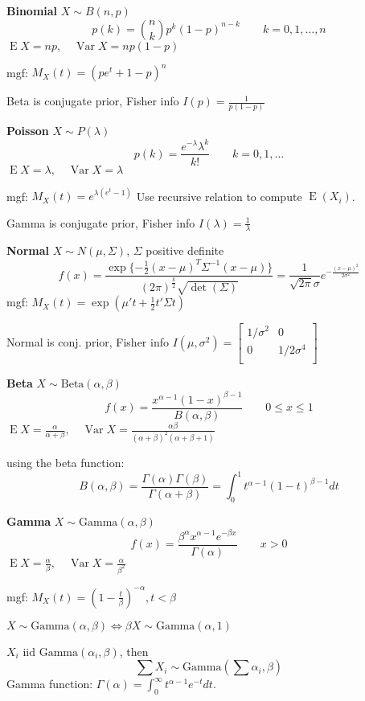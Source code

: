 \documentclass[10pt, twocolumn]{article}
\newcommand{\iid}{\text{ iid }}
\newcommand{\Expect}{\operatorname{E}}
\newcommand{\Var}{\operatorname{Var}}
\begin{document}
\textbf{Binomial}
$X \sim B(n, p)$
\[
    p(k) = \binom{n}{k} p^k (1-p)^{n-k}
    \qquad k = 0, 1, \dots, n
\]
$\Expect X = np, \quad \Var X = np(1-p)$

mgf: $M_X (t) = (pe^t + 1 - p)^n$

Beta is conjugate prior, Fisher info $I(p) = \frac{1}{p(1 - p)}$

\textbf{Poisson}
$X \sim P(\lambda)$
\[
    p(k) = \frac{e^{-\lambda} \lambda^k}{k!}
    \qquad k = 0, 1, \dots
\]
$\Expect X = \lambda, \quad \Var X = \lambda$

mgf: $M_X (t) = e^{\lambda (e^t -1)}$ Use recursive relation to compute
$\Expect(X_i)$.

Gamma is conjugate prior, Fisher info $I(\lambda) = \frac{1}{\lambda}$

\textbf{Normal}
$X \sim N(\mu, \Sigma)$, $\Sigma$ positive definite
\[
    f(x) = \frac{\exp\{ - \frac{1}{2}(x - \mu)^T \Sigma^{-1} (x - \mu) \}}
        {(2\pi)^{\frac{k}{2}} \sqrt{\det(\Sigma)}}
        = \frac{1}{\sqrt{2 \pi} \sigma} e^{-\frac{(x - \mu)^2}{2
        \sigma^2}}
\]
mgf: $M_X (t) = \exp (\mu' t + \frac{1}{2} t' \Sigma t)$

Normal is conj. prior, Fisher info $I(\mu, \sigma^2) = 
[\begin{smallmatrix}
        1 / \sigma^2 & 0 \\
        0 & 1 / 2\sigma^4 \\
\end{smallmatrix}]$

\textbf{Beta}
$ X \sim \text{Beta}(\alpha, \beta)$
\[
    f(x) = \frac{x^{\alpha-1}(1 - x)^{\beta-1}}{B(\alpha, \beta)} 
    \qquad 0 \leq x \leq 1
\]
$\Expect X = \frac{\alpha}{\alpha + \beta},
\quad \Var X = \frac{\alpha \beta}{(\alpha + \beta)^2 (\alpha + \beta + 1)}$

using the beta function:
\[
    B(\alpha, \beta) =
    \frac{\Gamma(\alpha) \Gamma(\beta)}{\Gamma(\alpha+ \beta)} =
    \int_0^1 t^{\alpha -1} (1-t)^{\beta - 1}dt
\]

\textbf{Gamma}
$X \sim \text{Gamma}(\alpha, \beta)$
\[
    f(x) = \frac{\beta^\alpha x^{\alpha-1} e^{-\beta x}}{\Gamma(\alpha)}
    \qquad x > 0
\]
$\Expect X = \frac{\alpha}{\beta},
\quad \Var X = \frac{\alpha}{\beta^2}$

mgf: $M_X (t) = (1 - \frac{t}{\beta})^{-\alpha}, t < \beta$

$X \sim \text{Gamma}(\alpha, \beta) \iff \beta X \sim \text{Gamma}(\alpha, 1)$

$X_i \iid \text{Gamma}(\alpha_i, \beta)$, then
\[
    \sum X_i \sim \text{Gamma}(\sum \alpha_i, \beta)
\]
Gamma function: $\Gamma(\alpha) = \int_0^\infty t^{\alpha-1} e^{-t} dt$.
\end{document}
